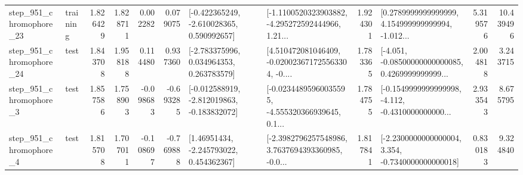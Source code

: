 \begin{tabular}{llrrrrllrlrr}
  step\_951\_chromophore\_23 &  training &      1.826429 &    1.828711 &      0.002282 &  0.079075 &   [-0.422365249, -2.610028365, 0.590992657] &  [-1.1100520323903882, -4.295272592444966, 1.21... &       1.924301 &  [0.2789999999999999, 4.154999999999994, -1.012... &            5.319576 &         10.439496 \\
  step\_951\_chromophore\_24 &      test &      1.843708 &    1.958188 &      0.114480 &  0.937360 &    [-2.783375996, 0.034964353, 0.263783579] &  [4.510472081046409, -0.020023671725563304, -0.... &       1.783365 &  [-4.051, -0.08500000000000085, 0.4269999999999... &            2.004818 &          3.243715 \\
   step\_951\_chromophore\_3 &      test &      1.857586 &    1.758903 &     -0.098683 & -0.693285 &  [-0.012588919, -2.812019863, -0.183832072] &  [-0.02344895960035595, -4.555320366939645, 0.1... &       1.784755 &  [-0.1549999999999998, -4.112, -0.4310000000000... &            2.933543 &          8.675795 \\
   step\_951\_chromophore\_4 &      test &      1.815708 &    1.707011 &     -0.108697 & -0.769888 &     [1.46951434, -2.245793022, 0.454362367] &  [-2.3982796257548986, 3.7637694393360985, -0.0... &       1.817841 &  [-2.2300000000000004, 3.354, -0.7340000000000018] &            0.830183 &          9.324840 \\
\bottomrule
\end{tabular}

